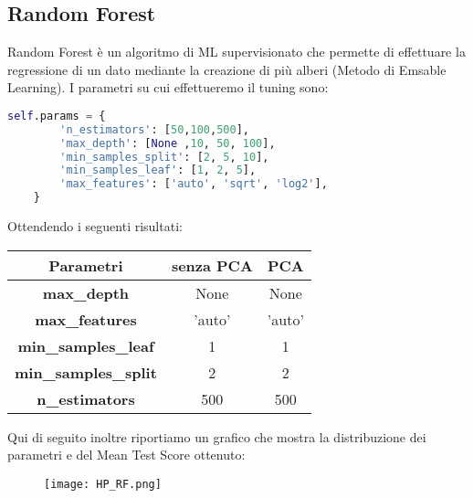 \documentclass[../../Report.tex]{subfiles}
\begin{document}
\subsection{Random Forest}
Random Forest è un algoritmo di ML supervisionato che permette di effettuare la regressione di un dato mediante la creazione di più alberi (Metodo di Emsable Learning).
I parametri su cui effettueremo il tuning sono:
\begin{lstlisting}[language=Python]
    self.params = {
        'n_estimators': [50,100,500],
        'max_depth': [None ,10, 50, 100],
        'min_samples_split': [2, 5, 10],
        'min_samples_leaf': [1, 2, 5],
        'max_features': ['auto', 'sqrt', 'log2'],
    }
\end{lstlisting}
Ottendendo i seguenti risultati:
\begin{table}[H]
    \centering
    \begin{tabular}{|c|c|c|}
    \hline
    \textbf{Parametri} & \textbf{senza PCA} & \textbf{PCA} \\ \hline
    \textbf{max\_depth}& None & None\\
    \textbf{max\_features}& 'auto' &  'auto' \\
    \textbf{min\_samples\_leaf}& 1 & 1\\
    \textbf{min\_samples\_split}& 2 & 2\\
    \textbf{n\_estimators}& 500 & 500\\
\hline

\end{tabular}
\end{table}
Qui di seguito inoltre riportiamo un grafico che mostra la distribuzione dei parametri e del Mean Test Score ottenuto:
\begin{figure}[H]
    \centering
    \texttt{[image: HP\_RF.png]}
\end{figure}
\end{document}
